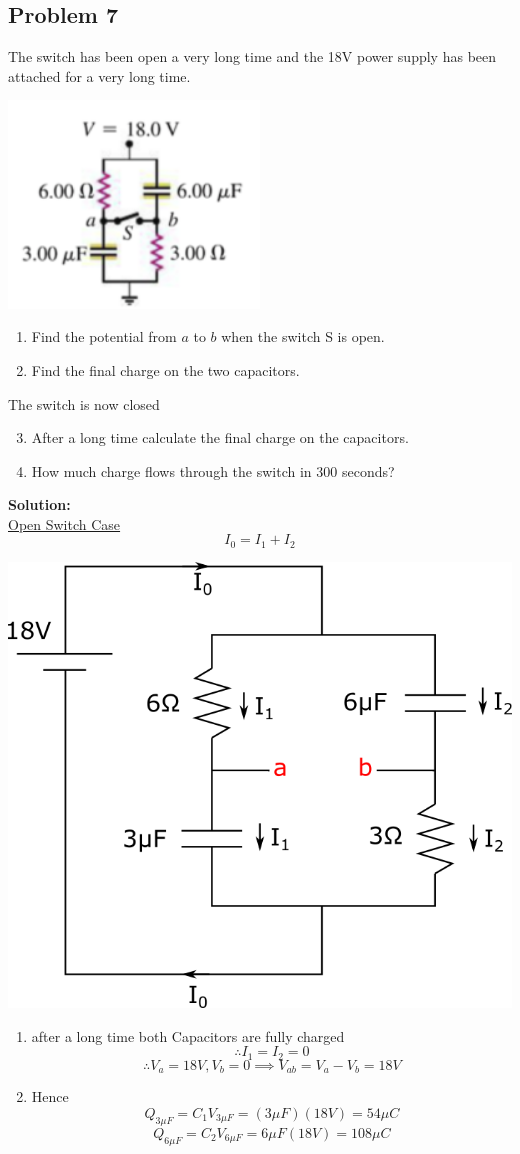 \subsection*{Problem 7}
The switch has been open a very long time and the 18V power supply has been attached for a very
long time.\\
\centerline{\includegraphics[width=0.5\textwidth]{Images/P7img1.png}}
\begin{enumerate}
    \item Find the potential from $a$ to $b$ when the switch S is open.
    \item Find the final charge on the two capacitors.
\end{enumerate}
The switch is now closed
\begin{enumerate}
    \setcounter{enumi}{2}
    \item After a long time calculate the final charge on the capacitors.
    \item How much charge flows through the switch in 300 seconds?
\end{enumerate}

\textbf{Solution:}\\
\underline{Open Switch Case}
$$I_0 = I_1 + I_2$$
\vspace{5mm}

\hspace{5mm}\includegraphics[width=0.4\linewidth]{Images/P7img2.png}

\begin{enumerate}
    \item after a long time both Capacitors are fully charged
        $$\therefore I_1=I_2=0$$
        $$\therefore V_a=18V, V_b=0 \implies V_{ab}=V_a-V_b=18V$$
    
    \item Hence $$Q_{3\mu F}=C_1V_{3\mu F} = (3\mu F)(18V) = 54\mu C$$
        $$Q_{6\mu F} = C_2V_{6\mu F} = 6\mu F (18V) = 108\mu C$$
\end{enumerate}

